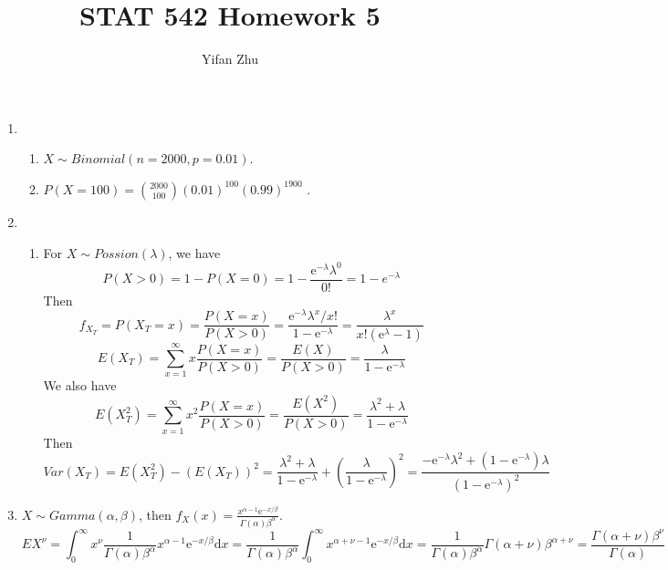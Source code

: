 \documentclass{article}
\begin{document}
	

	
	\title{STAT 542 Homework 5}
	\author{Yifan Zhu}
	\maketitle
	
	\begin{enumerate}[leftmargin = 0 em, label = \arabic*., font = \bfseries]
	\item 
	\begin{enumerate}
		\item $X \sim Binomial(n = 2000, p = 0.01)$.
		\item  $P(X = 100) = \binom{2000}{100} (0.01)^{100} (0.99)^{1900}$ .

	\end{enumerate}

	\item 
	\begin{enumerate}
		\item For $X \sim Possion(\lambda)$, we have
		\[P(X > 0) = 1 - P(X = 0) = 1 - \frac{\mathrm{e}^{- \lambda} \lambda ^0}{0!} = 1 - e^{- \lambda}\]
		Then 
		\[f_{X_T} = P(X_T = x) = \frac{P(X = x)}{P(X > 0)} = \frac{\mathrm{e}^{- \lambda} \lambda^x / x!}{1 - \mathrm{e}^{-\lambda}} = \frac{\lambda^x}{x! (\mathrm{e}^\lambda -1)}\]
		\[E(X_T) = \sum_{x = 1}^\infty x \frac{P(X = x)}{P(X > 0)} = \frac{E(X)}{P(X > 0)} = \frac{\lambda}{1 - \mathrm{e}^{-\lambda}}\]
		We also have
		\[E(X_T^2) = \sum_{x = 1}^\infty x^2 \frac{P(X = x)}{P(X > 0)} = \frac{E(X^2)}{P(X > 0)} = \frac{\lambda^2 + \lambda}{1- \mathrm{e}^{-\lambda}}\]
		Then
		\[Var(X_T) = E(X_T^2) - (E(X_T))^2 = \frac{\lambda^2 + \lambda}{1 - \mathrm{e}^{- \lambda}} + \left(\frac{\lambda}{1 - \mathrm{e}^{-\lambda}}\right)^2 = \frac{- \mathrm{e}^{- \lambda}\lambda^2 + (1 - \mathrm{e}^{-\lambda})\lambda}{(1 - \mathrm{e}^{-\lambda})^2}\]
	\end{enumerate}
	
	\item $X \sim Gamma(\alpha , \beta)$, then $f_X (x) = \frac{x^{\alpha - 1}\mathrm{e}^{-x / \beta}}{\Gamma (\alpha) \beta^\alpha}$.
	\[EX^\nu = \int_{0}^\infty x^{\nu} \frac{1}{\Gamma(\alpha) \beta^\alpha} x^{\alpha -1} \mathrm{e}^{- x / \beta} \mathrm{d}x = \frac{1}{\Gamma(\alpha)\beta^\alpha} \int_{0}^\infty x^{\alpha + \nu -1} \mathrm{e}^{- x / \beta}\mathrm{d}x = \frac{1}{\Gamma(\alpha) \beta^\alpha} \Gamma(\alpha + \nu) \beta^{\alpha + \nu} = \frac{\Gamma(\alpha + \nu) \beta^\nu}{\Gamma(\alpha)}\]


\end{enumerate}
\end{document}
